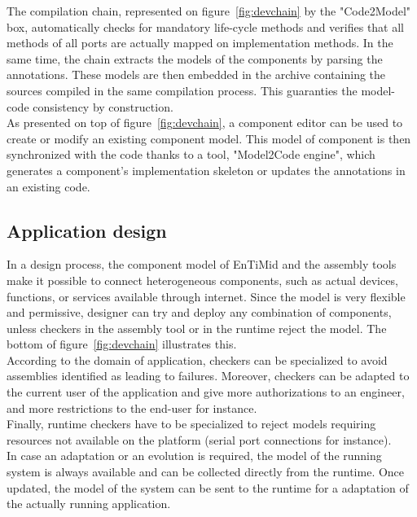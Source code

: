 The compilation chain, represented on figure~\ref{fig:devchain} by the "Code2Model" box, automatically checks for mandatory life-cycle methods and verifies that all methods of all ports are actually mapped on implementation methods. In the same time, the chain extracts the models of the components by parsing the annotations. These models are then embedded in the archive containing the sources compiled in the same compilation process. This guaranties the model-code consistency by construction.\\

As presented on top of figure~\ref{fig:devchain}, a component editor can be used to create or modify an existing component model. This model of component is then synchronized with the code thanks to a tool, "Model2Code engine", which generates a component's implementation skeleton or updates the annotations in an existing code.

\subsection{Application design}

In a design process, the component model of EnTiMid and the assembly tools make it possible to connect heterogeneous components, such as actual devices, functions, or services available through internet. Since the model is very flexible and permissive, designer can try and deploy any combination of components, unless checkers in the assembly tool or in the runtime reject the model. The bottom of figure~\ref{fig:devchain} illustrates this.\\

According to the domain of application, checkers can be specialized to avoid assemblies identified as leading to failures. Moreover, checkers can be adapted to the current user of the application and give more authorizations to an engineer, and more restrictions to the end-user for instance.\\

Finally, runtime checkers have to be specialized to reject models requiring resources not available on the platform (serial port connections for instance).\\

In case an adaptation or an evolution is required, the model of the running system is always available and can be collected directly from the runtime. Once updated, the model of the system can be sent to the runtime for a adaptation of the actually running application.



